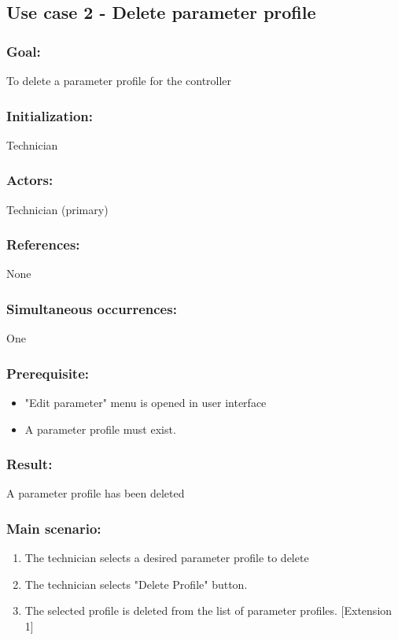 \begin{framed}
	\subsection{Use case 2 - Delete parameter profile}
	\subsubsection*{Goal:}
	To delete a parameter profile for the controller
	
	\subsubsection*{Initialization:}
	Technician
	
	\subsubsection*{Actors:}
	Technician (primary)
	
	\subsubsection*{References:}
	None
	
	\subsubsection*{Simultaneous occurrences:}
	One
	
	\subsubsection*{Prerequisite:}
	\begin{itemize}
		\item "Edit parameter" menu is opened in user interface
		\item A parameter profile must exist.
	\end{itemize}
	
	\subsubsection*{Result:}
	A parameter profile has been deleted
	
	\subsubsection*{Main scenario:}
	\begin{enumerate}
		\item The technician selects a desired parameter profile to delete
		\item The technician selects "Delete Profile" button.
		\item The selected profile is deleted from the list of parameter profiles. [Extension 1]
	\end{enumerate}	
	

\end{framed}
